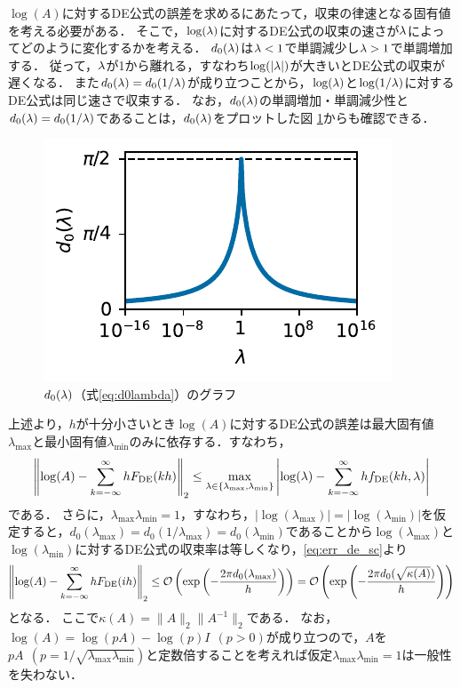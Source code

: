 \documentclass[12pt,a4paper,uplatex,dvipdfmx]{jsarticle}
\newcommand{\Fde}{F_{\mathrm{DE}}}
\newcommand{\fde}{f_{\mathrm{DE}}}
\newcommand{\lmdmax}{\lambda_{\mathrm{max}}}
\newcommand{\lmdmin}{\lambda_{\mathrm{min}}}
\begin{document}
  $\log(A)$に対するDE公式の誤差を求めるにあたって，収束の律速となる固有値を考える必要がある．
  そこで，$\log(\lambda)$に対するDE公式の収束の速さが$\lambda$によってどのように変化するかを考える．
  $d_0(\lambda)$は$\lambda<1$で単調減少し$\lambda>1$で単調増加する．
  従って，$\lambda$が1から離れる，すなわち$\log(|\lambda|)$が大きいとDE公式の収束が遅くなる．
  また$d_0(\lambda)=d_0(1/\lambda)$が成り立つことから，$\log(\lambda)$と$\log(1/\lambda)$に対するDE公式は同じ速さで収束する．
  なお，$d_0(\lambda)$の単調増加・単調減少性と$d_0(\lambda)=d_0(1/\lambda)$であることは，$d_0(\lambda)$をプロットした図 \ref{fig:d0lambda}からも確認できる．
  \begin{figure}[htbp]
    \centering
    \includegraphics{src/fig-d0lambda.pdf}
    \caption{$d_0(\lambda)$（式\eqref{eq:d0lambda}）のグラフ}
    \label{fig:d0lambda}
  \end{figure}

  上述より，$h$が十分小さいとき$\log(A)$に対するDE公式の誤差は最大固有値$\lmdmax$と最小固有値$\lmdmin$のみに依存する．すなわち，
  \begin{align}
    \norm{\log(A) - \sum_{k=-\infty}^\infty h\Fde(kh)}_2
    \le \max_{\lmd\in\{\lmdmax,\lmdmin\}}\left|\log(\lmd)- \sum_{k=-\infty}^\infty h\fde(kh,\lmd)\right|
  \end{align}
  である．
  さらに，$\lmdmax\lmdmin=1$，すなわち，$|\log(\lmdmax)|=|\log(\lmdmin)|$を仮定すると，$d_0(\lmdmax) = d_0(1/\lmdmax) = d_0(\lmdmin)$であることから$\log(\lmdmax)$と$\log(\lmdmin)$に対するDE公式の収束率は等しくなり，\eqref{eq:err_de_sc}より
  \begin{align}
    \norm{\log(A) - \sum_{k=-\infty}^\infty h\Fde(ih)}_2 \le \calO\left(\exp\left(-\frac{2\pi d_0(\lmdmax)}{h}\right)\right) = \calO\left(\exp\left(-\frac{2\pi d_0(\sqrt{\kpp(A)})}{h}\right)\right)
  \end{align}
  となる．
  ここで$\kappa(A)=\|A\|_2\|A^{-1}\|_2$である．
  なお，$\log(A) = \log(pA) - \log(p)I~~(p>0)$が成り立つので，$A$を$pA~~(p=1/\sqrt{\lmdmax\lmdmin})$と定数倍することを考えれば仮定$\lmdmax\lmdmin=1$は一般性を失わない．
  
\end{document}
